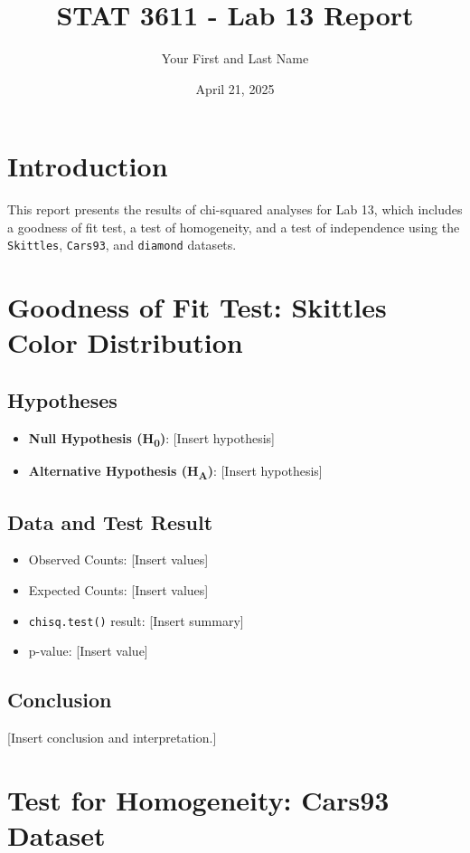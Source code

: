 \documentclass{article}
\title{STAT 3611 - Lab 13 Report}
\author{Your First and Last Name}
\date{April 21, 2025}
\begin{document}
\maketitle

\section{Introduction}
This report presents the results of chi-squared analyses for Lab 13, which includes a goodness of fit test, a test of homogeneity, and a test of independence using the \texttt{Skittles}, \texttt{Cars93}, and \texttt{diamond} datasets.

\section{Goodness of Fit Test: Skittles Color Distribution}
\subsection{Hypotheses}
\begin{itemize}
    \item \textbf{Null Hypothesis (H\textsubscript{0})}: [Insert hypothesis]
    \item \textbf{Alternative Hypothesis (H\textsubscript{A})}: [Insert hypothesis]
\end{itemize}

\subsection{Data and Test Result}
\begin{itemize}
    \item Observed Counts: [Insert values]
    \item Expected Counts: [Insert values]
    \item \texttt{chisq.test()} result: [Insert summary]
    \item p-value: [Insert value]
\end{itemize}

\subsection{Conclusion}
[Insert conclusion and interpretation.]

\section{Test for Homogeneity: Cars93 Dataset}
\end{document}
